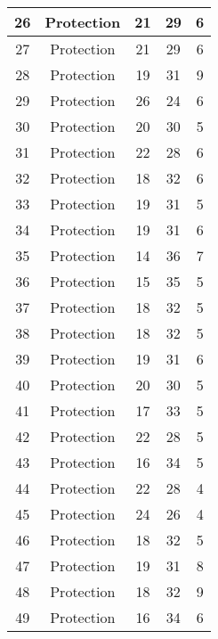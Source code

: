 \documentclass[results.tex]{subfiles}
\begin{document}
\begin{center}
\begin{tabular}{| c || c | c | c | c |}
    \hline
    26 & Protection & 21 & 29 & 6 \\ 
    \hline
    27 & Protection & 21 & 29 & 6 \\ 
    \hline
    28 & Protection & 19 & 31 & 9 \\ 
    \hline
    29 & Protection & 26 & 24 & 6 \\ 
    \hline
    30 & Protection & 20 & 30 & 5 \\ 
    \hline
    31 & Protection & 22 & 28 & 6 \\ 
    \hline
    32 & Protection & 18 & 32 & 6 \\ 
    \hline
    33 & Protection & 19 & 31 & 5 \\ 
    \hline
    34 & Protection & 19 & 31 & 6 \\ 
    \hline
    35 & Protection & 14 & 36 & 7 \\ 
    \hline
    36 & Protection & 15 & 35 & 5 \\ 
    \hline
    37 & Protection & 18 & 32 & 5 \\ 
    \hline
    38 & Protection & 18 & 32 & 5 \\ 
    \hline
    39 & Protection & 19 & 31 & 6 \\ 
    \hline
    40 & Protection & 20 & 30 & 5 \\ 
    \hline
    41 & Protection & 17 & 33 & 5 \\ 
    \hline
    42 & Protection & 22 & 28 & 5 \\ 
    \hline
    43 & Protection & 16 & 34 & 5 \\ 
    \hline
    44 & Protection & 22 & 28 & 4 \\ 
    \hline
    45 & Protection & 24 & 26 & 4 \\ 
    \hline
    46 & Protection & 18 & 32 & 5 \\ 
    \hline
    47 & Protection & 19 & 31 & 8 \\ 
    \hline
    48 & Protection & 18 & 32 & 9 \\ 
    \hline
    49 & Protection & 16 & 34 & 6 \\ 
    \hline   \end{tabular}
\end{center}
\end{document}
